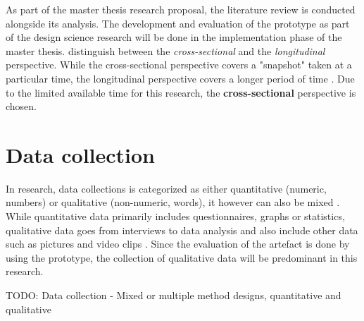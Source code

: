 As part of the master thesis research proposal, the literature review is conducted alongside its analysis. The development and evaluation of the prototype as part of the design science research will be done in the implementation phase of the master thesis.\newline
\cite{Saunders2009} distinguish between the \textit{cross-sectional} and the \textit{longitudinal} perspective. While the cross-sectional perspective covers a "snapshot" taken at a particular time, the longitudinal perspective covers a longer period of time \citep{Saunders2009}. Due to the limited available time for this research, the \textbf{cross-sectional} perspective is chosen.



\section{Data collection}

In research, data collections is categorized as either quantitative (numeric, numbers) or qualitative (non-numeric, words), it however can also be mixed \citep{Saunders2009}. While quantitative data primarily includes questionnaires, graphs or statistics, qualitative data goes from interviews to data analysis and also include other data such as pictures and video clips \citep{Saunders2009}. Since the evaluation of the artefact is done by using the prototype, the collection of qualitative data will be predominant in this research.




TODO: Data collection - Mixed or multiple method designs, quantitative and qualitative








